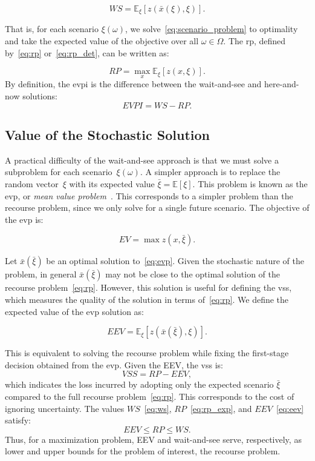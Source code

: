 \begin{equation}
	WS = \mathbb{E}_{\xi} \left[ z(\bar{x}(\xi), \xi) \right].
	\label{eq:ws}
\end{equation}

That is, for each scenario $\xi(\omega)$, we solve~\eqref{eq:scenario_problem}
to optimality and take the expected value of the objective over all $\omega \in
	\Omega$. The \gls{rp}, defined by~\eqref{eq:rp} or~\eqref{eq:rp_det}, can be
written as:

\begin{equation}
	RP = \max_{x} \mathbb{E}_{\xi} \left[ z(x, \xi) \right].
	\label{eq:rp_exp}
\end{equation}
By definition, the \gls{evpi} is the difference between the wait-and-see and
here-and-now solutions:
\[
	EVPI = WS - RP.
\]

\subsection{Value of the Stochastic Solution}

A practical difficulty of the wait-and-see approach is that we must solve a
subproblem for each scenario~$\xi(\omega)$. A simpler approach is to replace the
random vector~$\xi$ with its expected value $\bar{\xi} = \mathbb{E}[\xi]$. This
problem is known as the \gls{evp}, or \emph{mean value
	problem}~\cite{birge:2011}. This corresponds to a simpler problem than the
recourse problem, since we only solve for a single future scenario. The
objective of the \gls{evp} is:

\begin{equation}
	EV = \max z(x, \bar{\xi}).
	\label{eq:evp}
\end{equation}

Let $\bar{x}(\bar{\xi})$ be an optimal solution to~\eqref{eq:evp}. Given the
stochastic nature of the problem, in general $\bar{x}(\bar{\xi})$ may not be
close to the optimal solution of the recourse problem~\eqref{eq:rp}. However,
this solution is useful for defining the \gls{vss}, which measures the quality
of the solution in terms of~\eqref{eq:rp}. We define the expected value of the
\gls{evp} solution as:

\begin{equation}
	EEV = \mathbb{E}_{\xi} \left[ z(\bar{x}(\bar{\xi}), \xi) \right].
	\label{eq:eev}
\end{equation}

This is equivalent to solving the recourse problem while fixing the first-stage
decision obtained from the \gls{evp}. Given the EEV, the \gls{vss} is:
\[
	VSS = RP - EEV,
\]
which indicates the loss incurred by adopting only the expected scenario
$\bar{\xi}$ compared to the full recourse problem~\eqref{eq:rp}. This
corresponds to the cost of ignoring uncertainty. The values $WS$~\eqref{eq:ws},
$RP$~\eqref{eq:rp_exp}, and $EEV$~\eqref{eq:eev} satisfy:
\[
	EEV \leq RP \leq WS.
\]
Thus, for a maximization problem, EEV  and wait-and-see serve, respectively, as
lower and upper bounds for the problem of interest, the recourse problem.

